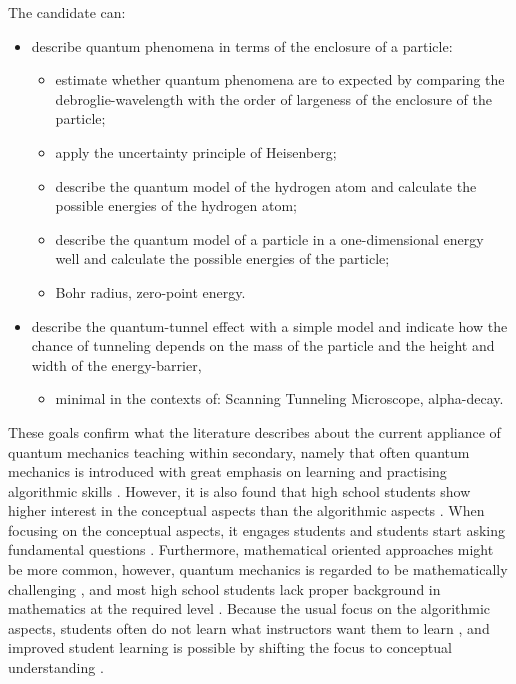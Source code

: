 \documentclass[11pt,twoside]{report} %
\begin{document}
The candidate can:
\begin{itemize}
\item describe quantum phenomena in terms of the enclosure of a particle:
\begin{itemize}
\item estimate whether quantum phenomena are to expected by comparing the debroglie-wavelength with the order of largeness of the enclosure of the particle;
\item apply the uncertainty principle of Heisenberg;
\item describe the quantum model of the hydrogen atom and calculate the possible energies of the hydrogen atom;
\item describe the quantum model of a particle in a one-dimensional energy well and calculate the possible energies of the particle;
\item Bohr radius, zero-point energy.
\end{itemize}
\item describe the quantum-tunnel effect with a simple model and indicate how the chance of tunneling depends on the mass of the particle and the height and width of the energy-barrier,
\begin{itemize}
\item minimal in the contexts of: Scanning Tunneling Microscope, alpha-decay.
\end{itemize} 
\end{itemize}

These goals confirm what the literature describes about the current appliance of quantum mechanics teaching within secondary, namely that often quantum mechanics is introduced with great emphasis on learning and practising algorithmic skills \cite{papaphotis1,papaphotis2}. However, it is also found that high school students show higher interest in the conceptual aspects than the algorithmic aspects \cite{papaphotis1,papaphotis2,levrini}. When focusing on the conceptual aspects, it engages students \cite{henriksen} and students start asking fundamental questions \cite{mckagan}. Furthermore, mathematical oriented approaches might be more common, however, quantum mechanics is regarded to be mathematically challenging \cite{gianino, mckagan}, and most high school students lack proper background in mathematics at the required level \cite{dori}. Because the usual focus on the algorithmic aspects, students often do not learn what instructors want them to learn \cite{asikainen, mckagan}, and improved student learning is possible by shifting the focus to conceptual understanding \cite{mckagan}.
\end{document}
